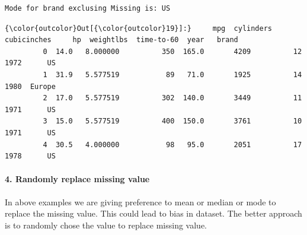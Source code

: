 \documentclass[11pt]{article}
\begin{document}
    \begin{Verbatim}[commandchars=\\\{\}]
Mode for brand exclusing Missing is: US

    \end{Verbatim}

\begin{Verbatim}[commandchars=\\\{\}]
{\color{outcolor}Out[{\color{outcolor}19}]:}     mpg  cylinders  cubicinches     hp  weightlbs  time-to-60  year   brand
         0  14.0   8.000000          350  165.0       4209          12  1972      US
         1  31.9   5.577519           89   71.0       1925          14  1980  Europe
         2  17.0   5.577519          302  140.0       3449          11  1971      US
         3  15.0   5.577519          400  150.0       3761          10  1971      US
         4  30.5   4.000000           98   95.0       2051          17  1978      US
\end{Verbatim}
            
    \paragraph{ 4. Randomly replace missing
value}\label{randomly-replace-missing-value}

In above examples we are giving preference to mean or median or mode to
replace the missing value. This could lead to bias in dataset. The
better approach is to randomly chose the value to replace missing value.
\end{document}
